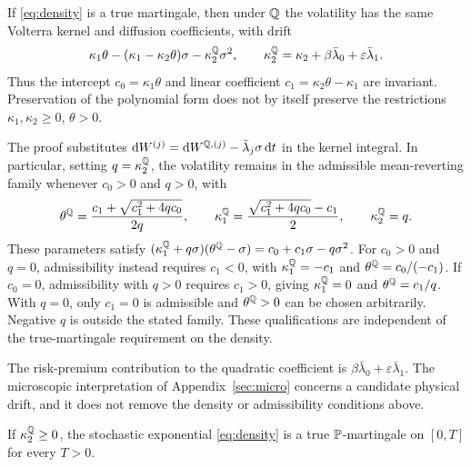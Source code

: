 \begin{proposition}\label{prop:closure}
If \eqref{eq:density} is a true martingale, then under $\Q$ the volatility has the same Volterra kernel and diffusion coefficients, with drift
\begin{equation}\label{eq:drift_Q}
\kappa_1\theta-(\kappa_1-\kappa_2\theta)\sigma-\kappa_2^{\Q}\sigma^2,\qquad \kappa_2^{\Q}=\kappa_2+\beta\bar\lambda_0+\varepsilon\bar\lambda_1 .
\end{equation}
Thus the intercept $c_0=\kappa_1\theta$ and linear coefficient $c_1=\kappa_2\theta-\kappa_1$ are invariant. Preservation of the polynomial form does not by itself preserve the restrictions $\kappa_1,\kappa_2\ge0$, $\theta>0$.
\end{proposition}

The proof substitutes $\D W^{(j)}=\D W^{\Q,(j)}-\bar\lambda_j\sigma\,\D t$ in the kernel integral. In particular, setting $q=\kappa_2^{\Q}$, the volatility remains in the admissible mean-reverting family whenever $c_0>0$ and $q>0$, with
\begin{equation*}
\theta^{\Q}=\frac{c_1+\sqrt{c_1^2+4qc_0}}{2q},\qquad
\kappa_1^{\Q}=\frac{\sqrt{c_1^2+4qc_0}-c_1}{2},\qquad
\kappa_2^{\Q}=q.
\end{equation*}
These parameters satisfy $(\kappa_1^{\Q}+q\sigma)(\theta^{\Q}-\sigma)=c_0+c_1\sigma-q\sigma^2$.
For $c_0>0$ and $q=0$, admissibility instead requires $c_1<0$, with $\kappa_1^{\Q}=-c_1$ and $\theta^{\Q}=c_0/(-c_1)$. If $c_0=0$, admissibility with $q>0$ requires $c_1>0$, giving $\kappa_1^{\Q}=0$ and $\theta^{\Q}=c_1/q$. With $q=0$, only $c_1=0$ is admissible and $\theta^{\Q}>0$ can be chosen arbitrarily. Negative $q$ is outside the stated family. These qualifications are independent of the true-martingale requirement on the density.

The risk-premium contribution to the quadratic coefficient is $\beta\bar\lambda_0+\varepsilon\bar\lambda_1$. The microscopic interpretation of Appendix~\ref{sec:micro} concerns a candidate physical drift, and it does not remove the density or admissibility conditions above.

\begin{corollary}\label{cor:density}
If $\kappa_2^{\Q}\ge0$, the stochastic exponential \eqref{eq:density} is a true $\P$-martingale on $[0,T]$ for every $T>0$.
\end{corollary}

